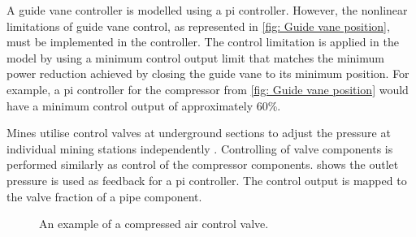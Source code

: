 	
		A guide vane controller is modelled using a \gls{pi} controller. However, the nonlinear limitations of guide vane control, as represented in \cref{fig: Guide vane position}, must be implemented in the controller. The control limitation is applied in the model by using a minimum control output limit that matches the minimum power reduction achieved by closing the guide vane to its minimum position. For example, a \gls{pi} controller for the compressor from \cref{fig: Guide vane position} would have a minimum control output of approximately 60\%.
		\par 
		Mines utilise control valves at underground sections to adjust the pressure at individual mining stations independently \cite{Heyns2014Masters}. Controlling of valve components is performed similarly as control of the compressor components.  shows the outlet pressure is used as feedback for a \gls{pi} controller. The control output is mapped to the valve fraction of a pipe component.
		\begin{figure}[h]
			\centering
			\caption[An example of a compressed air control valve.]{An example of a compressed air control valve\cite{van2015implementation}.} 
			\label{fig: Control}
		\end{figure}
